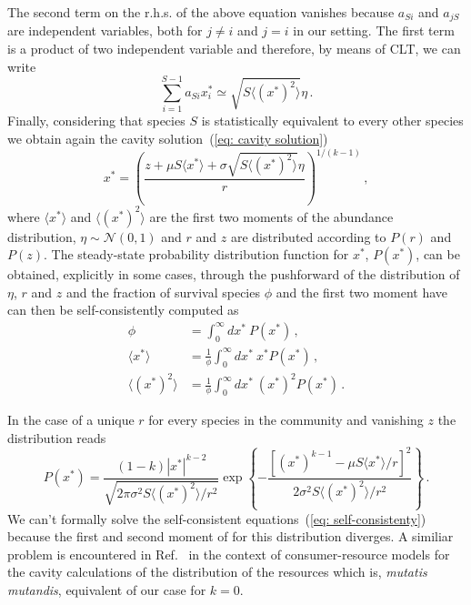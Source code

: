\documentclass[10pt]{article}
\begin{document}
The second term on the r.h.s. of the above equation vanishes because
$a_{Si}$ and $a_{jS}$ are independent variables, both for $j\neq i$ and $j=i$
in our setting. The first term is a product of two independent variable
and therefore, by means of CLT, we can write
\begin{equation}
    \sum_{i = 1}^{S-1}a_{Si}x_i^*\simeq \sqrt{S\langle (x^*)^2 \rangle}\eta \, .
\end{equation}
Finally, considering that species $S$ is statistically equivalent to
every other species we obtain again the cavity solution~(\ref{eq: cavity solution})
\begin{equation}
    x^* = \left(\frac{z + \mu S \langle x^* \rangle + \sigma \sqrt{S\langle (x^*)^2\rangle} \eta}
    {r}\right)^{1/(k-1)} \, ,
\end{equation}
where $\langle x^*\rangle$ and $\langle (x^*)^2\rangle$ are 
the first two moments of the abundance distribution, 
$\eta\sim\mathcal N (0,1)$ and $r$ and $z$ are distributed according to $P(r)$
and $P(z)$.
The steady-state probability distribution function for $x^*$, $P(x^*)$,
can be obtained, explicitly in some cases, 
through the pushforward of the distribution of $\eta$, $r$ and $z$ and
the fraction of survival species $\phi$ and the first two moment
have can then be self-consistently computed as
\begin{align}
    \phi&= \int_0^{\infty}dx^* \ P(x^*)\, , \nonumber \\
    \langle x^*\rangle&=\frac{1}{\phi}\int_0^{\infty}dx^* \ x^*P(x^*) \, , \label{eq: self-consistenty}\\
    \langle (x^*)^2\rangle&=\frac{1}{\phi}\int_0^{\infty}dx^* \ (x^*)^2 P(x^*) \, . \nonumber
\end{align}

In the case of a unique $r$ for every species in the community and vanishing $z$
the distribution reads
\begin{equation}
    P(x^*)=\frac{(1-k)|x^*|^{k-2}}{\sqrt{2\pi \sigma^2 S\langle (x^*)^2 \rangle/r^2}}
    \exp{\left\{-\frac{\left[(x^*)^{k-1}-\mu S\langle x^*\rangle/r\right]^2}{2\sigma^2S\langle (x^*)^2 \rangle/r^2}\right\}} \, .
    \label{eq: species dist unique r}
\end{equation}
We can't formally solve the self-consistent equations~(\ref{eq: self-consistenty})
because the first and second moment of  for this distribution diverges.
A similiar problem is encountered in Ref.~\cite{Cui2020}
in the context of consumer-resource models for the cavity calculations of
the distribution of the resources which is, \textit{mutatis mutandis}, 
equivalent of our case for $k=0$.
\end{document}
